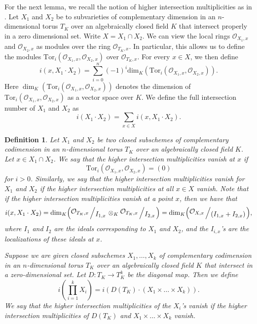 \documentclass[12pt,reqno,a4paper]{amsart}
\theoremstyle{theoremstyle}
\theoremstyle{examplestyle}
\newtheorem{definition}[theorem]{Definition}
\theoremstyle{algorithmstyle}
\newcommand{\bigslant}[2]{{\raisebox{.2em}{$#1$}\left/\raisebox{-.2em}{$#2$}\right.}}
\begin{document}
For the next lemma, we recall the notion of higher intersection multiplicities as in \cite[Section 6.8]{OR2013}. %
Let $X_{1}$ and $X_{2}$ be to subvarieties of complementary dimension in an $n$-dimensional torus $T_K$ over an algebraically closed field $K$ that intersect properly in a zero dimensional set. Write $X=X_{1}\cap X_{2}$. We can view the local rings $\mathcal{O}_{X_{1},x}$ and $\mathcal{O}_{X_{2},x}$ as modules over the ring $\mathcal{O}_{T_K,x}$. In particular, this allows us to define the modules $\mathrm{Tor}_{i}(\mathcal{O}_{X_{1},x},\mathcal{O}_{X_{2},x})$ over $\mathcal{O}_{T_K,x}$.
For every $x\in{X}$, we then define %
\begin{equation*}
    i(x,X_{1}\cdot X_{2})=\sum_{i=0}^{n}(-1)^{i}\mathrm{dim}_K(\mathrm{Tor}_{i}(\mathcal{O}_{{X}_{1},x},\mathcal{O}_{X_{2},x})).
\end{equation*}
Here $\dim_K(\mathrm{Tor}_{i}(\mathcal{O}_{{X}_{1},x},\mathcal{O}_{X_{2},x}))$ denotes the dimension of $\mathrm{Tor}_{i}(\mathcal{O}_{{X}_{1},x},\mathcal{O}_{X_{2},x})$ as a vector space over $K$. %
%
We define the full intersection number of $X_{1}$ and $X_{2}$ as
\begin{equation*}
    i(X_{1}\cdot X_{2})=\sum_{x\in{X}}i(x,X_{1}\cdot X_{2}).
\end{equation*}
\begin{definition}
Let $X_{1}$ and $X_{2}$ be two closed subschemes of complementary codimension in an $n$-dimensional torus $T_K$ over an algebraically closed field $K$. Let $x\in{X_{1}\cap X_{2}}$.
    We say that the higher intersection multiplicities vanish at $x$ if $$\mathrm{Tor}_{i}(\mathcal{O}_{{X}_{1},x},\mathcal{O}_{X_{2},x})=(0)$$ for $i>0$. Similarly, we say that the higher intersection multiplicities vanish for $X_{1}$ and $X_{2}$ if the higher intersection multiplicities at all $x\in{X}$ vanish. Note that if the higher intersection multiplicities vanish at a point $x$, then we have that
    \begin{equation*}
        i(x,X_{1}\cdot X_{2})=\mathrm{dim}_K\Big(\bigslant{\mathcal{O}_{T_K,x}}{I_{1,x}}\otimes_{K}\bigslant{\mathcal{O}_{T_K,x}}{I_{2,x}}\Big)=\mathrm{dim}_K\Big(\bigslant{\mathcal{O}_{X,x}}{(I_{1,x}+I_{2,x})}\Big),
    \end{equation*}
    where $I_{1}$ and $I_{2}$ are the ideals corresponding to $X_{1}$ and $X_{2}$, and the $I_{i,x}$'s are the localizations of these ideals at $x$.


Suppose we are given closed subschemes $X_{1},\dots,X_{k}$ of complementary codimension in an $n$-dimensional torus $T_K$ over an algebraically closed field $K$ that intersect in a zero-dimensional set. %
Let $D\colon T_K\to T_K^{k}$ be the diagonal map. Then we define
\begin{equation*}
    i(\prod_{i=1}^{k}X_{i})=i(D(T_K)\cdot (X_{1}\times \dots\times X_{k})).
\end{equation*}
We say that the higher intersection multiplicities of the $X_{i}$'s vanish if the higher intersection multiplicities of $D(T_K)$ and $X_{1}\times \dots\times X_{k}$ vanish.
\end{definition}
\end{document}
